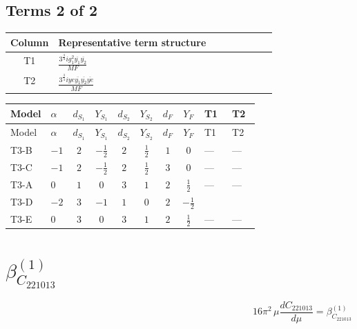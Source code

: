 \documentclass[8pt]{article}
\begin{document}
\begin{landscape}
\subsection*{Terms 2 of 2}
\begin{center}
\begin{tabular}{@{}c >{\raggedright\arraybackslash}p{0.82\linewidth}@{}}
\toprule
Column & Representative term structure \\
\midrule
T1 & \(\displaystyle \frac{3^{\frac{3}{4}} i g_{1}^{2} \overline{y_{1}} \overline{y_{2}}}{MF}\) \\
\midrule
T2 & \(\displaystyle \frac{3^{\frac{3}{4}} i ye \overline{y_{1}} \overline{y_{2}} \overline{ye}}{MF}\) \\
\midrule
\bottomrule
\end{tabular}
\end{center}
\smallskip
\tiny
\begin{longtable}{@{}llcccccc >{\raggedright\arraybackslash}p{0.21\linewidth} >{\raggedright\arraybackslash}p{0.21\linewidth}@{}}
\toprule
Model & $\alpha$ & $d_{S_1}$ & $Y_{S_1}$ & $d_{S_2}$ & $Y_{S_2}$ & $d_F$ & $Y_F$ & T1 & T2 \\
\midrule
\endfirsthead
\toprule
Model & $\alpha$ & $d_{S_1}$ & $Y_{S_1}$ & $d_{S_2}$ & $Y_{S_2}$ & $d_F$ & $Y_F$ & T1 & T2 \\
\midrule
\endhead
T3-B & $-1$ & $2$ & $-\frac{1}{2}$ & $2$ & $\frac{1}{2}$ & $1$ & $0$ & --- & --- \\
\midrule
T3-C & $-1$ & $2$ & $-\frac{1}{2}$ & $2$ & $\frac{1}{2}$ & $3$ & $0$ & --- & --- \\
\midrule
T3-A & $0$ & $1$ & $0$ & $3$ & $1$ & $2$ & $\frac{1}{2}$ & --- & --- \\
\midrule
T3-D & $-2$ & $3$ & $-1$ & $1$ & $0$ & $2$ & $-\frac{1}{2}$ & \scriptsize\adjustbox{max width=\linewidth}{$\begin{gathered} - \frac{3^{\frac{3}{4}} i g_{1}^{2} \overline{y_{1}} \overline{y_{2}}}{8 MF}\end{gathered}$} & \scriptsize\adjustbox{max width=\linewidth}{$\begin{gathered} \frac{3^{\frac{3}{4}} i ye \overline{y_{1}} \overline{y_{2}} \overline{ye}}{12 MF}\end{gathered}$} \\
\midrule
T3-E & $0$ & $3$ & $0$ & $3$ & $1$ & $2$ & $\frac{1}{2}$ & --- & --- \\
\midrule
\bottomrule
\end{longtable}
\clearpage
\section*{$\beta_{C_{221013}}^{(1)}$}
\[16\pi^2\,\mu\frac{d C_{221013}}{d\mu}=\beta_{C_{221013}}^{(1)}\]

\end{landscape}
\end{document}
